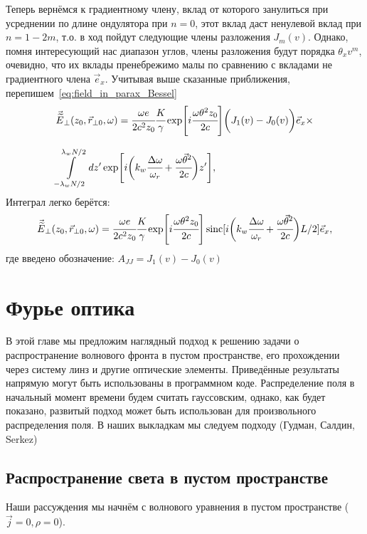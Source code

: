 \documentclass[14pt,a4paper]{extarticle}
\numberwithin{equation}{section}
\DeclareMathOperator{\sinc}{sinc}
\begin{document}
Теперь вернёмся к градиентному члену, вклад от которого занулиться при усреднении по длине ондулятора при $n = 0$, этот вклад даст ненулевой вклад при $n = 1 - 2m$, т.о. в ход пойдут следующие члены разложения $J_m(v)$. Однако, помня интересующий нас диапазон углов, члены разложения будут порядка $\theta_x v^m$, очевидно, что их вклады пренебрежимо малы по сравнению с вкладами не градиентного члена $\vec{e}_x$. Учитывая выше сказанные приближения, перепишем~\ref{eq:field_in_parax_Bessel}
\begin{equation}
	\begin{array}{lcl}
		\vec{\widetilde{E}}_{\bot}(z_0,  \vec{r}_{\bot 0}, \omega) =
		\cfrac{\omega e}{2c^2z_0}\cfrac{K}{\gamma}\exp[i\cfrac{\omega \theta^2 z_0}{2c}]
		\bigg(J_1(v) - J_0(v)\bigg)\vec{e}_x\times\\
		\\
		\displaystyle\int\limits_{-\lambda_w N/2}^{\lambda_w N/2} dz'
		\exp[i\bigg(k_w \cfrac{\Delta\omega}{\omega_r} + 
		\cfrac{\omega\vec{\theta}^2}{2c}\bigg)z'],
	\end{array}	
\end{equation}
Интеграл легко берётся:
\begin{equation}
	\begin{array}{lcl}
		\vec{\widetilde{E}}_{\bot}(z_0,  \vec{r}_{\bot 0}, \omega) =
		\cfrac{\omega e}{2c^2z_0}\cfrac{K}{\gamma}\exp[i\cfrac{\omega \theta^2 z_0}{2c}]
		\sinc[i\bigg(k_w \cfrac{\Delta\omega}{\omega_r} + 
		\cfrac{\omega\vec{\theta}^2}{2c}\bigg)L/2]\vec{e}_x ,
	\end{array}	
\end{equation}
где введено обозначение: $A_{JJ} = J_1(v) - J_0(v)$


\section{Фурье оптика}
В этой главе мы предложим наглядный подход к решению задачи о распространение волнового фронта в пустом пространстве, его прохождении через систему линз и другие оптические элементы. Приведённые результаты напрямую могут быть использованы в программном коде. Распределение поля в начальный момент времени будем считать гауссовским, однако, как будет показано, развитый подход может быть использован для произвольного распределения поля. В наших выкладкам мы следуем подходу (Гудман, Салдин, Serkez)
\subsection{Распространение света в пустом пространстве}
Наши рассуждения мы начнём с волнового уравнения в пустом пространстве ($\vec{j} = 0, \rho = 0$). 
\end{document}
